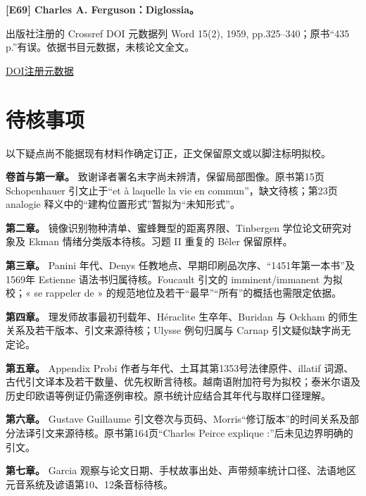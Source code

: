 \par\noindent\begin{minipage}{\linewidth}
\label{ref-69}\noindent\textbf{[E69] Charles A. Ferguson：Diglossia。}\par\nobreak
出版社注册的 Crossref DOI 元数据列 Word 15(2), 1959, pp.325–340；原书“435 p.”有误。依据书目元数据，未核论文全文。\par
{\small\href{https://api.crossref.org/works/10.1080/00437956.1959.11659702}{DOI注册元数据}}\par
\par\end{minipage}\par
\endgroup

\section*{待核事项}
以下疑点尚不能据现有材料作确定订正，正文保留原文或以脚注标明拟校。

\begingroup
\small{}\setlength{\parindent}{0pt}\setlength{\parskip}{.25em}
\textbf{卷首与第一章。} 致谢译者署名末字尚未辨清，保留局部图像。原书第15页 Schopenhauer 引文止于“et à laquelle la vie en commun”，缺文待核；第23页 analogie 释义中的“建构位置形式”暂拟为“未知形式”。

\textbf{第二章。} 镜像识别物种清单、蜜蜂舞型的距离界限、Tinbergen 学位论文研究对象及 Ekman 情绪分类版本待核。习题 II 重复的 Bêler 保留原样。

\textbf{第三章。} Panini 年代、Denys 任教地点、早期印刷品次序、“1451年第一本书”及1569年 Estienne 语法书归属待核。Foucault 引文的 imminent/immanent 为拟校；« se rappeler de » 的规范地位及若干“最早”“所有”的概括也需限定依据。

\textbf{第四章。} 理发师故事最初刊载年、Héraclite 生卒年、Buridan 与 Ockham 的师生关系及若干版本、引文来源待核；Ulysse 例句归属与 Carnap 引文疑似缺字尚无定论。

\textbf{第五章。} Appendix Probi 作者与年代、土耳其第1353号法律原件、illatif 词源、古代引文译本及若干数量、优先权断言待核。越南语附加符号为拟校；泰米尔语及历史印欧语等例证仍需逐例审校。原书统计应结合其年代与取样口径理解。

\textbf{第六章。} Gustave Guillaume 引文卷次与页码、Morris“修订版本”的时间关系及部分法译引文来源待核。原书第164页“Charles Peirce explique :”后未见边界明确的引文。

\textbf{第七章。} Garcia 观察与论文日期、手杖故事出处、声带频率统计口径、法语地区元音系统及谚语第10、12条音标待核。

